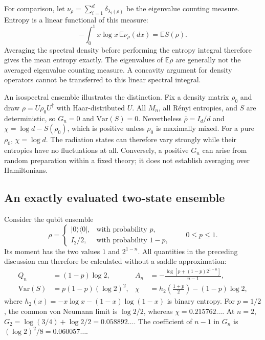\documentclass[11pt,letterpaper]{article}
\theoremstyle{plain}
\theoremstyle{definition}
\theoremstyle{remark}
\newcommand{\E}{\mathbb{E}}
\newcommand{\Var}{\text{Var}}
\begin{document}
For comparison, let $\nu_\rho=\sum_{i=1}^d\delta_{\lambda_i(\rho)}$
be the eigenvalue counting measure.  Entropy is a linear functional of
this measure:
\begin{equation}
 -\int_0^1 x\log x\,\E\nu_\rho(dx)=\E S(\rho).
 \label{eq12:averaged_spectral_density}
\end{equation}
Averaging the spectral density before performing the entropy integral
therefore gives the mean entropy exactly.  The eigenvalues of
$\E\rho$ are generally not the averaged eigenvalue counting measure.
A concavity argument for density operators cannot be transferred to
this linear spectral integral.

An isospectral ensemble illustrates the distinction.  Fix a density
matrix $\rho_0$ and draw $\rho=U\rho_0U^\dagger$ with Haar-distributed
$U$.  All $M_n$, all R\'enyi entropies, and $S$ are deterministic, so
$G_n=0$ and $\Var(S)=0$.  Nevertheless $\bar\rho=I_d/d$ and
$\chi=\log d-S(\rho_0)$, which is positive unless $\rho_0$ is maximally
mixed.  For a pure $\rho_0$, $\chi=\log d$.  The radiation states can
therefore vary strongly while their entropies have no fluctuations at
all.  Conversely, a positive $G_n$ can arise from random preparation
within a fixed theory; it does not establish averaging over Hamiltonians.

\subsection{An exactly evaluated two-state ensemble}
\label{subsec12:two_state_example}

Consider the qubit ensemble
\begin{equation}
 \rho=\begin{cases}
 |0\rangle\langle0|,&\text{with probability }p,\\
 I_2/2,&\text{with probability }1-p,
 \end{cases}
 \qquad 0\leq p\leq1.
 \label{eq12:two_state_ensemble}
\end{equation}
Its moment has the two values $1$ and $2^{1-n}$.  All quantities in the
preceding discussion can therefore be calculated without a saddle
approximation:
\begin{align}
 Q_n&=(1-p)\log2,
 & A_n&=-\frac{\log[p+(1-p)2^{1-n}]}{n-1},
 \label{eq12:two_state_renyi}\\
 \Var(S)&=p(1-p)(\log2)^2,
 & \chi&=h_2\!\left(\frac{1+p}{2}\right)-(1-p)\log2,
 \label{eq12:two_state_variance}
\end{align}
where $h_2(x)=-x\log x-(1-x)\log(1-x)$ is binary entropy.
For $p=1/2$, the common von Neumann limit is $\log2/2$, whereas
$\chi=0.215762\ldots$.  At $n=2$,
$G_2=\log(3/4)+\log2/2=0.058892\ldots$.  The coefficient of $n-1$
in $G_n$ is $(\log2)^2/8=0.060057\ldots$.
\end{document}
